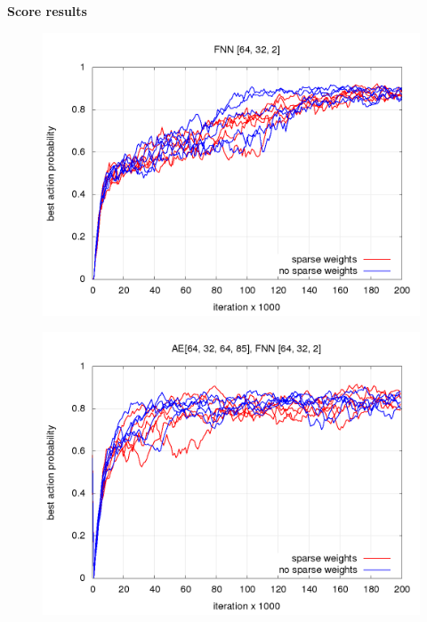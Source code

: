 \documentclass[xcolor=dvipsnames]{beamer}
\begin{document}
\begin{frame}{\bf Score results}


\begin{figure}[!htb]
\centering
\begin{minipage}{.5\textwidth}
  \centering
  \includegraphics[scale=0.15]{../../results/rl_arcade/fnn_progress/training_progress.png}
  \label{img:FNN progress comparison}
\end{minipage}%
\begin{minipage}{.5\textwidth}
  \centering
  \includegraphics[scale=0.15]{../../results/rl_arcade/hnn_progress/training_progress.png}
  \label{img:AE+FNN progress comparison}
\end{minipage}
\end{figure}



\end{frame}
\end{document}
